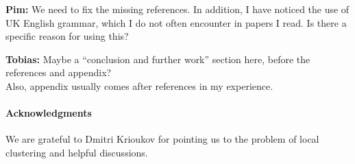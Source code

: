 \documentclass[a4paper,10pt]{article}
\newcommand{\1}{\mathds{1}}								%
\newcommand{\BL}[1]{{{\color{blue} #1}}}
\newcommand{\OR}[1]{{{\color{orange} #1}}}
\newcommand{\PvdH}[1]{{\OR{{\bf Pim:} #1}}}
\newcommand{\TM}[1]{\BL{{\bf Tobias:} #1}}
\begin{document}
\tableofcontents

\newpage

\PvdH{We need to fix the missing references. In addition, I have noticed the use of UK English grammar, which I do not often encounter in papers I read. Is there a specific reason for using this?}



















\TM{ Maybe a ``conclusion and further work'' section here,  before the references and appendix? \\
Also, appendix usually comes after references in my experience.}

\paragraph{Acknowledgments} We are grateful to Dmitri Krioukov for pointing us to the problem of local clustering and helpful discussions.






\end{document}
